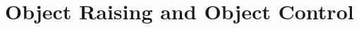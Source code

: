 \documentclass[a4paper,landscape,headrule,footrule]{foils}
\begin{document}



    







\section{Object Raising and Object Control}
\end{document}
